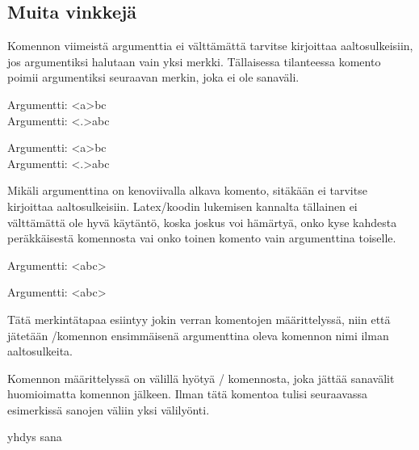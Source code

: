 \subsection{Muita vinkkejä}
\label{luku:komennot-lisä}

Komennon viimeistä argumenttia ei välttämättä tarvitse kirjoittaa
aaltosulkeisiin, jos argumentiksi halutaan vain yksi merkki. Tällaisessa
tilanteessa komento poimii argumentiksi seuraavan merkin, joka ei ole
sanaväli.

\begin{koodilohkosis}
\newcommand{\x}[1]{Argumentti: <#1>}
\x abc \\
\x.abc
\end{koodilohkosis}

\begin{tulossis}
  Argumentti: <a>bc \\
  Argumentti: <.>abc
\end{tulossis}

Mikäli argumenttina on kenoviivalla alkava komento, sitäkään ei tarvitse
kirjoittaa aaltosulkeisiin. Latex\-/koodin lukemisen kannalta tällainen
ei välttämättä ole hyvä käytäntö, koska joskus voi hämärtyä, onko kyse
kahdesta peräkkäisestä komennosta vai onko toinen komento vain
argumenttina toiselle.

\begin{koodilohkosis}
\newcommand{\x}[1]{Argumentti: <#1>}
\newcommand{\yyy}{abc}
\x\yyy
\end{koodilohkosis}

\begin{tulossis}
  Argumentti: <abc>
\end{tulossis}

Tätä merkintätapaa esiintyy jokin verran komentojen määrittelyssä, niin
että jätetään \-/komennon ensimmäisenä argumenttina
oleva komennon nimi ilman aaltosulkeita.

\begin{koodilohkosis}
\newcommand\yyy{abc}
\end{koodilohkosis}

Komennon määrittelyssä on välillä hyötyä \-/
komennosta, joka jättää sanavälit huomioimatta komennon jälkeen. Ilman
tätä komentoa tulisi seuraavassa esimerkissä sanojen väliin yksi
välilyönti.

\begin{koodilohkosis}
\newcommand{\komento}[1]{#1\ignorespaces}
\komento{yhdys}       sana
\end{koodilohkosis}

